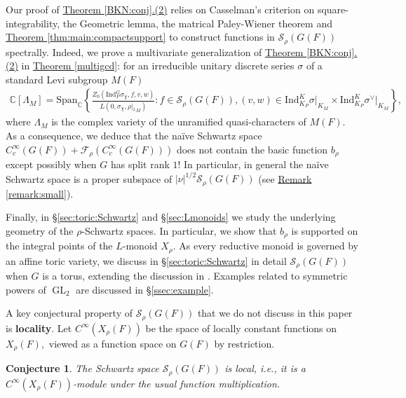 \documentclass[10pt]{amsart}
\newtheorem{conjecture}[theorem]{Conjecture}
\theoremstyle{definition}
\numberwithin{equation}{section}
\DeclareMathOperator{\GL}{\mathrm{GL}}
\numberwithin{equation}{subsection}
\newcommand{\Ind}{\mathrm{Ind}}
\newcommand{\CC}{\mathbb{C}}
\begin{document}
Our proof of \hyperref[BKN:conj]{Theorem \ref{BKN:conj}.(2)} relies on Casselman's criterion on square-integrability, the Geometric lemma, the matrical Paley-Wiener theorem and \hyperref[thm:main:compactsupport]{Theorem \ref{thm:main:compactsupport}} to construct functions in $\mathcal{S}_\rho(G(F))$ spectrally. Indeed, we prove a multivariate generalization of \hyperref[BKN:conj]{Theorem \ref{BKN:conj}.(2)} in \hyperref[multigcd]{Theorem \ref{multigcd}}: for an irreducible unitary discrete series $\sigma$ of a standard Levi subgroup $M(F)$
\begin{align*}
    \CC[\Lambda_M]=\mathrm{Span}_\CC\left\{\frac{Z_0(\mathrm{Ind}_P^G \sigma_\chi,f,v,w)}{L(0,\sigma_\chi,\rho|_{{}^LM})}: f\in \mathcal{S}_\rho(G(F)),(v,w)\in \Ind_{K_P}^K\sigma\vert_{K_M}\times \Ind_{K_P}^K\sigma^\vee\vert_{K_M}\right\},
\end{align*}
where $\Lambda_M$ is the complex variety of the unramified quasi-characters of $M(F)$. As a consequence, we deduce that the na\"ive Schwartz space $C^\infty_c(G(F))+\mathcal{F}_\rho(C^\infty_c(G(F)))$ does not contain the basic function $b_\rho$ except possibly when $G$ has split rank $1$! In particular, in general the na\"ive Schwartz space is a proper subspace of $|\nu|^{1/2}\mathcal{S}_\rho(G(F))$ (see \hyperref[remark:small]{Remark \ref{remark:small}}).

Finally, in \S\ref{sec:toric:Schwartz} and \S\ref{sec:Lmonoids} we study the underlying geometry of the $\rho$-Schwartz spaces. In particular, we show that $b_\rho$ is supported on the integral points of the $L$-monoid $X_\rho$. As every reductive monoid is governed by an affine toric variety, we discuss in \S\ref{sec:toric:Schwartz}  in detail $\mathcal{S}_\rho(G(F))$ when $G$ is a torus, extending the discussion in \cite[\S 2.2]{Luo:Ngo}. Examples related to symmetric powers of $\GL_2$ are discussed in \S\ref{ssec:example}.

A key conjectural property of $\mathcal{S}_\rho(G(F))$ that we do not discuss in this paper is \textbf{locality}. Let $C^\infty(X_\rho(F))$ be the space of locally constant functions on $X_\rho(F),$ viewed as a function space on $G(F)$ by restriction.
\begin{conjecture}
    The Schwartz space $\mathcal{S}_\rho(G(F))$ is local, i.e., it is a $C^\infty(X_\rho(F))$-module under the usual function multiplication.
\end{conjecture}
\end{document}
